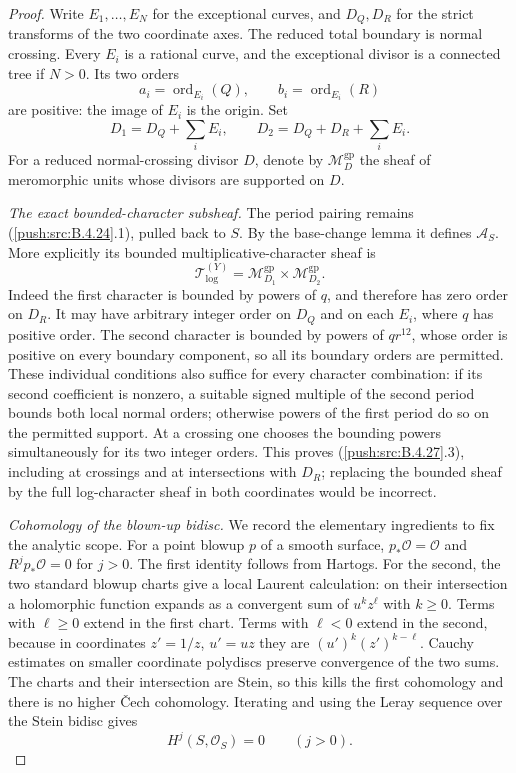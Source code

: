 \begin{proof}
Write $E_1,\ldots,E_N$ for the exceptional curves,
and $D_Q,D_R$ for the strict transforms of the
two coordinate axes. The reduced total boundary
is normal crossing. Every $E_i$ is a rational
curve, and the exceptional divisor is a connected
tree if $N>0$. Its two orders
\[
 a_i=\operatorname{ord}_{E_i}(Q),\qquad
 b_i=\operatorname{ord}_{E_i}(R)
 \tag{B.4.27.2}
\]
are positive: the image of $E_i$ is the origin.
Set
\[
 D_1=D_Q+\sum_i E_i,\qquad
 D_2=D_Q+D_R+\sum_i E_i.
\]
For a reduced normal-crossing divisor $D$, denote
by $\mathcal M_D^{\mathrm{gp}}$ the sheaf of
meromorphic units whose divisors are supported
on $D$.

\emph{The exact bounded-character subsheaf.}
The period pairing remains (\ref{push:src:B.4.24}.1), pulled
back to $S$. By the base-change lemma
\citep[Lemma 1.2.9, pp.~80--81]{KKN2008Root}
it defines $\mathcal A_S$. More explicitly its
bounded multiplicative-character sheaf is
\[
 \mathcal T_{\log}^{(Y)}
   =\mathcal M_{D_1}^{\mathrm{gp}}
          \times\mathcal M_{D_2}^{\mathrm{gp}}.
 \tag{B.4.27.3}
\]
Indeed the first character is bounded by powers
of $q$, and therefore has zero order on $D_R$.
It may have arbitrary integer order on $D_Q$
and on each $E_i$, where $q$ has positive order.
The second character is bounded by powers of
$q r^{12}$, whose order is positive on every
boundary component, so all its boundary orders
are permitted. These individual conditions
also suffice for every character combination:
if its second coefficient is nonzero, a suitable
signed multiple of the second period bounds
both local normal orders; otherwise powers of
the first period do so on the permitted support.
At a crossing one chooses the bounding powers
simultaneously for its two integer orders.
This proves (\ref{push:src:B.4.27}.3), including at crossings
and at intersections with $D_R$; replacing the
bounded sheaf by the full log-character sheaf
in both coordinates would be incorrect.

\emph{Cohomology of the blown-up bidisc.}
We record the elementary ingredients to fix
the analytic scope. For a point blowup $p$ of
a smooth surface,
$p_*\mathcal O=\mathcal O$ and
$R^j p_*\mathcal O=0$ for $j>0$.
The first identity follows from Hartogs.
For the second, the two standard blowup charts
give a local Laurent calculation: on their
intersection a holomorphic function expands
as a convergent sum of $u^k z^\ell$ with
$k\ge0$. Terms with $\ell\ge0$ extend in
the first chart. Terms with $\ell<0$ extend
in the second, because in coordinates
$z'=1/z$, $u'=uz$ they are
$(u')^k(z')^{k-\ell}$. Cauchy estimates on
smaller coordinate polydiscs preserve convergence
of the two sums. The charts and their
intersection are Stein, so this kills the
first cohomology and there is no higher
\v Cech cohomology. Iterating and using the
Leray sequence over the Stein bidisc gives
\[
 H^j(S,\mathcal O_S)=0\qquad(j>0).
 \tag{B.4.27.4}
\]


\end{proof}
